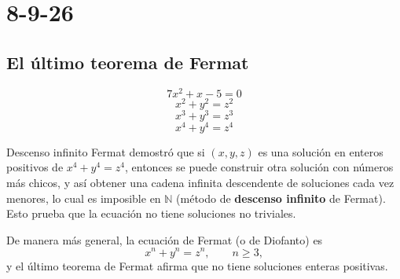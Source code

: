 \chapter{8-9-26}
\section{El último teorema de Fermat}

\[
7x^2 + x - 5 = 0
\]
\[
x^2 + y^2 = z^2
\]
\[
x^3 + y^3 = z^3
\]
\[
x^4 + y^4 = z^4
\]

\begin{nota}{Descenso infinito}
Fermat demostró que si $(x,y,z)$ es una solución en enteros positivos de
$x^4+y^4=z^4$, entonces se puede construir otra solución con números
más chicos, y así obtener una cadena infinita descendente de soluciones
cada vez menores, lo cual es imposible en $\mathbb{N}$ (método de
\textbf{descenso infinito} de Fermat). Esto prueba que la ecuación no
tiene soluciones no triviales.
\end{nota}

De manera más general, la ecuación de Fermat (o de Diofanto) es
\[
x^n + y^n = z^n, \qquad n \geq 3,
\]
y el último teorema de Fermat afirma que no tiene soluciones enteras
positivas.

